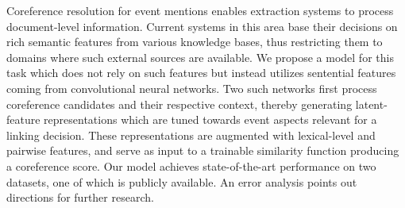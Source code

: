 Coreference resolution for event mentions enables extraction systems to process document-level information. Current systems in this area base their decisions on rich semantic features from various knowledge bases, thus restricting them to domains where such external sources are available. We propose a model for this task which does not rely on such features but instead utilizes sentential features coming from convolutional neural networks. Two such networks first process coreference candidates and their respective context, thereby generating latent-feature representations which are tuned towards event aspects relevant for a linking decision. These representations are augmented with lexical-level and pairwise features, and serve as input to a trainable similarity function producing a coreference score. Our model achieves state-of-the-art performance on two datasets, one of which is publicly available. An error analysis points out directions for further research.
